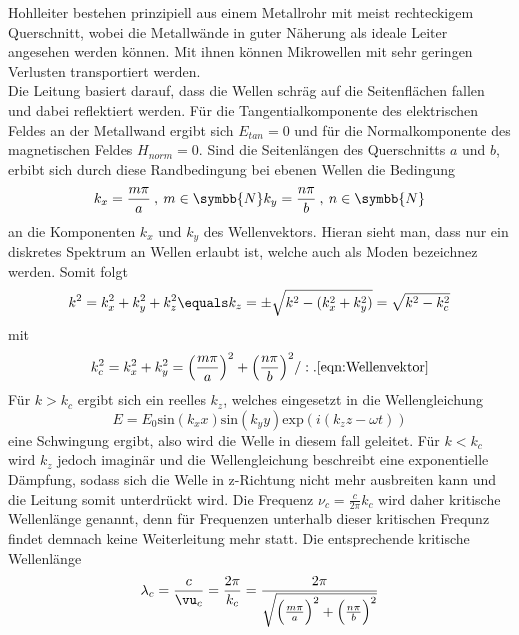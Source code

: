 Hohlleiter bestehen prinzipiell aus einem Metallrohr mit meist rechteckigem Querschnitt, wobei die
Metallwände in guter Näherung als ideale Leiter angesehen werden können. Mit ihnen können
Mikrowellen mit sehr geringen Verlusten transportiert werden. \\
Die Leitung basiert darauf, dass die Wellen schräg auf die Seitenflächen fallen und dabei reflektiert werden.
Für die Tangentialkomponente des elektrischen Feldes an der Metallwand ergibt sich $E_{tan}=0 $ und für die
Normalkomponente des magnetischen Feldes $H_{norm}=0$. Sind die Seitenlängen des Querschnitts $a$ und $b$,
erbibt sich durch diese Randbedingung bei ebenen Wellen die Bedingung
\begin{equation}
  k_x = \frac{m\pi}{a} \:, \: m \in \symbb{N} \\
  k_y = \frac{n\pi}{b} \:, \: n \in \symbb{N}
  \label{eqn:Bwv}
\end{equation}
an die Komponenten $k_x$ und $k_y$ des Wellenvektors.
Hieran sieht man, dass nur ein diskretes Spektrum an Wellen erlaubt ist, welche auch als Moden bezeichnez werden.
Somit folgt
\begin{equation}
  k^2 = k_x^2 + k_y^2 + k_z^2 \\
  \equals k_z = \pm \sqrt{k^2-(k_x^2 + k_y^2)} = \sqrt{k^2-k_c^2}
  \label{eqn:wellenv}
\end{equation}
mit
\begin{equation}
  k_c^2=k_x^2 + k_y^2= \Bigl(\frac{m\pi}{a}\Bigr)^2 + \Bigl(\frac{n\pi}{b}\Bigr)^2 /:.
  \ref{eqn:Wellenvektor}
\end{equation}
Für $k>k_c$ ergibt sich ein reelles $k_z$, welches eingesetzt in die Wellengleichung
\begin{equation}
  E=E_0 \text{sin}(k_xx)\text{sin}(k_yy)\text{exp}(i(k_zz-\omega t))
  \label{eqn:Wellengleichung}
\end{equation}
eine Schwingung ergibt, also wird die Welle in diesem fall geleitet. Für $k<k_c$ wird
$k_z$ jedoch imaginär und die Wellengleichung beschreibt eine exponentielle Dämpfung,
sodass sich die Welle in z-Richtung nicht mehr ausbreiten kann und die Leitung somit unterdrückt wird.
Die Frequenz $\nu_c = \frac{c}{2\pi}k_c$ wird daher kritische Wellenlänge genannt, denn
für Frequenzen unterhalb dieser kritischen Frequnz findet demnach keine
Weiterleitung mehr statt. Die entsprechende kritische Wellenlänge
\begin{equation}
  \lambda_c = \frac{c}{\vu_c}=\frac{2\pi}{k_c} =\frac{2\pi}{\sqrt{\Bigl(\frac{m\pi}{a}\Bigr)^2 + \Bigl(\frac{n\pi}{b}\Bigr)^2}}
  \label{eqn:Lambdac}
\end{equation}
